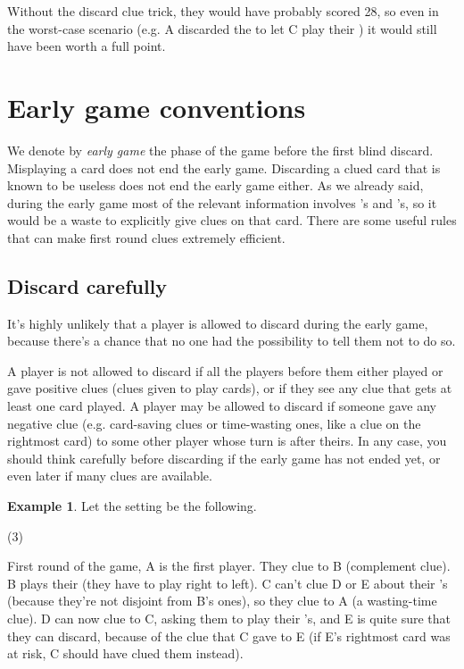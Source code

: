\documentclass[a4paper]{article}
\theoremstyle{plain}
\theoremstyle{definition}
\newtheorem{example}[theorem]{Example}
\begin{document}
Without the discard clue trick, they would have probably scored 28, so even in the worst-case scenario (e.g. A discarded the  to let C play their ) it would still have been worth a full point.

\section{Early game conventions}
\label{sec:earlygame}

We denote by \textit{early game} the phase of the game before the first blind discard. Misplaying a card does not end the early game. Discarding a clued card that is known to be useless does not end the early game either. As we already said, during the early game most of the relevant information involves 's and 's, so it would be a waste to explicitly give clues on that card. There are some useful rules that can make first round clues extremely efficient.

\subsection{Discard carefully}

It's highly unlikely that a player is allowed to discard during the early game, because there's a chance that no one had the possibility to tell them not to do so.

A player is not allowed to discard if all the players before them either played or gave positive clues (clues given to play cards), or if they see any clue that gets at least one card played. A player may be allowed to discard if someone gave any negative clue (e.g. card-saving clues or time-wasting ones, like a  clue on the rightmost card) to some other player whose turn is after theirs. In any case, you should think carefully before discarding if the early game has not ended yet, or even later if many clues are available.

\begin{example}
	
	Let the setting be the following.
	
	\begin{tasks}(3)
		\task[+]      
		\task[A]    
		\task[B]    
		\task[C]    
		\task[D]    
		\task[E]    
	\end{tasks}
	
	First round of the game, A is the first player. They clue  to B (complement clue). B plays their  (they have to play right to left). C can't clue D or E about their 's (because they're not disjoint from B's ones), so they clue  to A (a wasting-time clue). D can now clue  to C, asking them to play their 's, and E is quite sure that they can discard, because of the  clue that C gave to E (if E's rightmost card was at risk, C should have clued them instead).
\end{example}
\end{document}
